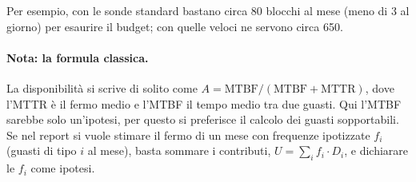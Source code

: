 Per esempio, con le sonde standard bastano circa 80 blocchi al mese (meno di 3 al giorno) per esaurire il budget; con quelle veloci ne servono circa 650.

\paragraph{Nota: la formula classica.} La disponibilità si scrive di solito come $A = \text{MTBF} / (\text{MTBF} + \text{MTTR})$, dove l'MTTR è il fermo medio e l'MTBF il tempo medio tra due guasti. Qui l'MTBF sarebbe solo un'ipotesi, per questo si preferisce il calcolo dei guasti sopportabili. Se nel report si vuole stimare il fermo di un mese con frequenze ipotizzate $f_i$ (guasti di tipo $i$ al mese), basta sommare i contributi, $U = \sum_i f_i \cdot D_i$, e dichiarare le $f_i$ come ipotesi.
